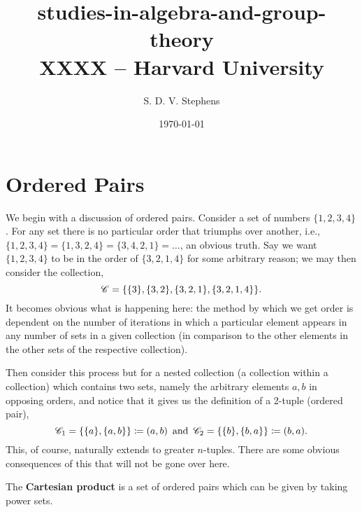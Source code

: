 \documentclass{report}
\title{\Huge{studies-in-algebra-and-group-theory}\\XXXX -- Harvard University}
\author{\huge{S. D. V. Stephens}}
\date{\today}
\begin{document}
\maketitle
\newpage
{}
\tableofcontents
\pagebreak




\section{Ordered Pairs}
We begin with a discussion of ordered pairs. Consider a set of numbers \( \{1,2,3,4\}   \). For any set there is no particular order that triumphs over another, i.e., \( \{1,2,3,4\} = \{1,3,2,4\} = \{3,4,2,1\} =\ldots     \), an obvious truth. Say we want \( \{1,2,3,4\}   \) to be in the order of \( \{3,2,1,4\}   \) for some arbitrary reason; we may then consider the collection,
\[
  {\mathscr{C}} = \{\{3\} , \{3,2\} ,\{3,2,1\} , \{3,2,1,4\}     \}
.\] 
It becomes obvious what is happening here: the method by which we get order is dependent on the number of iterations in which a particular element appears in any number of sets in a given collection (in comparison to the other elements in the other sets of the respective collection). 

Then consider this process but for a nested collection (a collection within a collection) which contains two sets, namely the arbitrary elements \( a,b \) in opposing orders, and notice that it gives us the definition of a 2-tuple (ordered pair),
\[
  {\mathscr{C}}_{1} = \{\{a\} ,\{a,b\}   \} \coloneqq (a,b) \, \text{ and }\, {\mathscr{C}}_{2}  = \{\{b\} ,\{b,a\}   \} \coloneqq  (b,a)  
.\] 
This, of course, naturally extends to greater \( n \)-tuples. There are some obvious consequences of this that will not be gone over here. 

The \textbf{Cartesian product} is a set of ordered pairs which can be given by taking power sets. 

\end{document}
